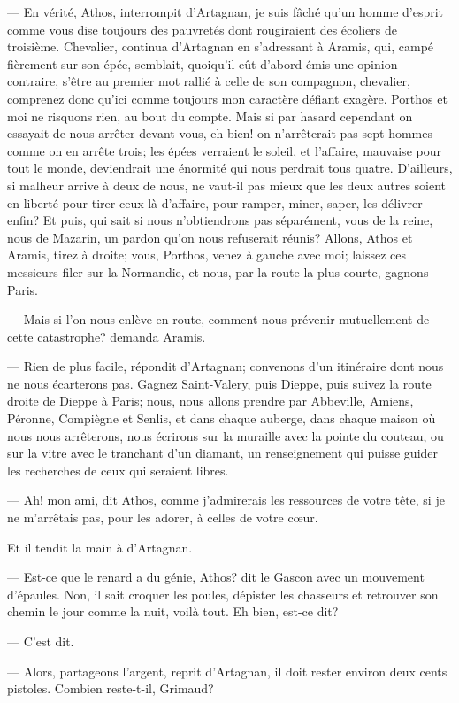 — En vérité, Athos, interrompit d'Artagnan, je suis fâché qu'un homme d'esprit comme vous dise toujours des pauvretés dont rougiraient des écoliers de troisième. Chevalier, continua d'Artagnan en s'adressant à Aramis, qui, campé fièrement sur son épée, semblait, quoiqu'il eût d'abord émis une opinion contraire, s'être au premier mot rallié à celle de son compagnon, chevalier, comprenez donc qu'ici comme toujours mon caractère défiant exagère. Porthos et moi ne risquons rien, au bout du compte. Mais si par hasard cependant on essayait de nous arrêter devant vous, eh bien! on n'arrêterait pas sept hommes comme on en arrête trois; les épées verraient le soleil, et l'affaire, mauvaise pour tout le monde, deviendrait une énormité qui nous perdrait tous quatre. D'ailleurs, si malheur arrive à deux de nous, ne vaut-il pas mieux que les deux autres soient en liberté pour tirer ceux-là d'affaire, pour ramper, miner, saper, les délivrer enfin? Et puis, qui sait si nous n'obtiendrons pas séparément, vous de la reine, nous de Mazarin, un pardon qu'on nous refuserait réunis? Allons, Athos et Aramis, tirez à droite; vous, Porthos, venez à gauche avec moi; laissez ces messieurs filer sur la Normandie, et nous, par la route la plus courte, gagnons Paris.

— Mais si l'on nous enlève en route, comment nous prévenir mutuellement de cette catastrophe? demanda Aramis.

— Rien de plus facile, répondit d'Artagnan; convenons d'un itinéraire dont nous ne nous écarterons pas. Gagnez Saint-Valery, puis Dieppe, puis suivez la route droite de Dieppe à Paris; nous, nous allons prendre par Abbeville, Amiens, Péronne, Compiègne et Senlis, et dans chaque auberge, dans chaque maison où nous nous arrêterons, nous écrirons sur la muraille avec la pointe du couteau, ou sur la vitre avec le tranchant d'un diamant, un renseignement qui puisse guider les recherches de ceux qui seraient libres.

— Ah! mon ami, dit Athos, comme j'admirerais les ressources de votre tête, si je ne m'arrêtais pas, pour les adorer, à celles de votre cœur.

Et il tendit la main à d'Artagnan.

— Est-ce que le renard a du génie, Athos? dit le Gascon avec un mouvement d'épaules. Non, il sait croquer les poules, dépister les chasseurs et retrouver son chemin le jour comme la nuit, voilà tout. Eh bien, est-ce dit?

— C'est dit.

— Alors, partageons l'argent, reprit d'Artagnan, il doit rester environ deux cents pistoles. Combien reste-t-il, Grimaud?

